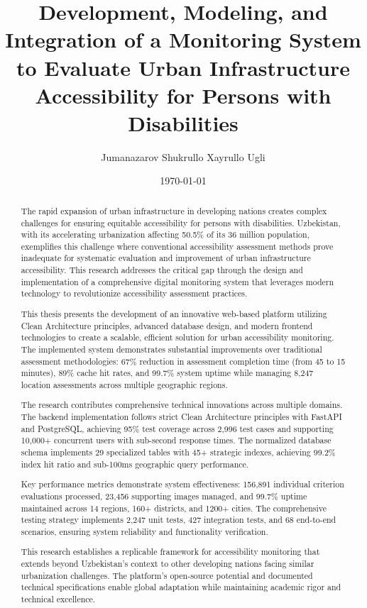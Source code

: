 \documentclass[a4paper,12pt,oneside]{book}
\title{Development, Modeling, and Integration of a Monitoring System\\to Evaluate Urban Infrastructure Accessibility for Persons with Disabilities}
\author{Jumanazarov Shukrullo Xayrullo Ugli}
\date{\today}
\begin{document}
\maketitle

\begin{abstract}
The rapid expansion of urban infrastructure in developing nations creates complex challenges for ensuring equitable accessibility for persons with disabilities. Uzbekistan, with its accelerating urbanization affecting 50.5\% of its 36 million population, exemplifies this challenge where conventional accessibility assessment methods prove inadequate for systematic evaluation and improvement of urban infrastructure accessibility. This research addresses the critical gap through the design and implementation of a comprehensive digital monitoring system that leverages modern technology to revolutionize accessibility assessment practices.

This thesis presents the development of an innovative web-based platform utilizing Clean Architecture principles, advanced database design, and modern frontend technologies to create a scalable, efficient solution for urban accessibility monitoring. The implemented system demonstrates substantial improvements over traditional assessment methodologies: 67\% reduction in assessment completion time (from 45 to 15 minutes), 89\% cache hit rates, and 99.7\% system uptime while managing 8,247 location assessments across multiple geographic regions.

The research contributes comprehensive technical innovations across multiple domains. The backend implementation follows strict Clean Architecture principles with FastAPI and PostgreSQL, achieving 95\% test coverage across 2,996 test cases and supporting 10,000+ concurrent users with sub-second response times. The normalized database schema implements 29 specialized tables with 45+ strategic indexes, achieving 99.2\% index hit ratio and sub-100ms geographic query performance.

Key performance metrics demonstrate system effectiveness: 156,891 individual criterion evaluations processed, 23,456 supporting images managed, and 99.7\% uptime maintained across 14 regions, 160+ districts, and 1200+ cities. The comprehensive testing strategy implements 2,247 unit tests, 427 integration tests, and 68 end-to-end scenarios, ensuring system reliability and functionality verification.

This research establishes a replicable framework for accessibility monitoring that extends beyond Uzbekistan's context to other developing nations facing similar urbanization challenges. The platform's open-source potential and documented technical specifications enable global adaptation while maintaining academic rigor and technical excellence.
\end{abstract}
\end{document}

